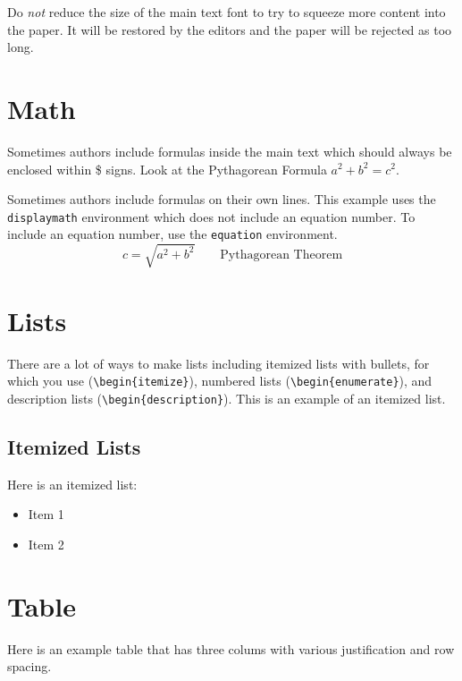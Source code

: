 \documentclass[11pt,twoside]{article}
\begin{document}
Do \emph{not} reduce the size of the main text font to try to squeeze more content into the paper. It will be restored by the editors and the paper will be rejected as too long.

\section{Math}
Sometimes authors include formulas inside the main text which should always be enclosed within \$ signs.  Look at the Pythagorean Formula $a^2 + b^2 = c^2$.

Sometimes authors include formulas on their own lines.  This example uses the \verb"displaymath" environment which does not include an equation number.  To include an equation number, use the \verb"equation" environment.
\begin{displaymath}
c = \sqrt{a^2 + b^2} \qquad \textrm{Pythagorean Theorem}
\end{displaymath}

\section{Lists}
\label{ex_lists}
There are a lot of ways to make lists including itemized lists with bullets, for which you use  (\verb"\begin{itemize}"), numbered lists (\verb"\begin{enumerate}"), and description lists (\verb"\begin{description}").  This is an example of an itemized list.

\subsection{Itemized Lists}
Here is an itemized list:
\begin{itemize}
\item Item 1
\item Item 2
\end{itemize}


\section{Table}
Here is an example table that has three colums with various justification and row spacing.
\end{document}
